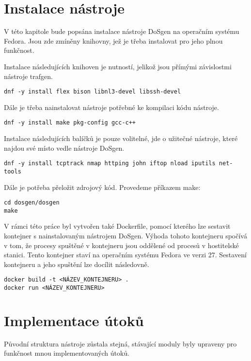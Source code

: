 
\section{Instalace nástroje}
V této kapitole bude popsána instalace nástroje DoSgen na operačním systému Fedora. Jsou zde zmíněny knihovny, jež je třeba instalovat pro jeho plnou funkčnost. 

\noindent Instalace následujících knihoven je nutností, jelikož jsou přímými závislostmi nástroje trafgen.
\begin{lstlisting}
dnf -y install flex bison libnl3-devel libssh-devel
\end{lstlisting}

\noindent Dále je třeba nainstalovat nástroje potřebné ke kompilaci kódu nástroje.
\begin{lstlisting}
dnf -y install make pkg-config gcc-c++
\end{lstlisting}

\noindent Instalace následujících balíčků je pouze volitelné, jde o užitečné nástroje, které najdou své místo vedle nástroje DoSgen.
\begin{lstlisting}
dnf -y install tcptrack nmap httping john iftop nload iputils net-tools
\end{lstlisting}

\noindent Dále je potřeba přeložit zdrojový kód. Provedeme příkazem make:
\begin{lstlisting}
cd dosgen/dosgen
make
\end{lstlisting}

V rámci této práce byl vytvořen také Dockerfile, pomocí kterého lze sestavit kontejner s nainstalovaným nástrojem DoSgen. Výhoda tohoto kontejneru spočívá v tom, že procesy spuštěné v kontejneru jsou oddělené od procesů v hostitelské stanici. Tento kontejner staví na operačním systému Fedora ve verzi 27. Sestavení kontejneru a jeho spuštění lze docílit následovně.
\begin{lstlisting}
docker build -t <NÁZEV_KONTEJNERU> .
docker run <NÁZEV_KONTEJNERU>
\end{lstlisting}

\section{Implementace útoků}
Původní struktura nástroje zůstala stejná, stávající moduly byly upraveny pro funkčnost mnou implementovaných útoků.

